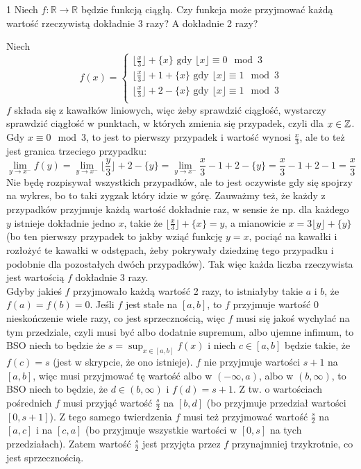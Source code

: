 \documentclass{../note}
\begin{document}
\begin{zadanie}{1}
Niech $f:\mathbb{R}\rightarrow\mathbb{R}$ będzie funkcją ciągłą. Czy funkcja może przyjmować każdą wartość rzeczywistą dokładnie 3 razy? A dokładnie 2 razy?
\end{zadanie}
\begin{rozwiazanie}
Niech
\[f(x) = \begin{cases}
    \lfloor\frac{x}{3}\rfloor + \{x\} \text{ gdy } \lfloor x\rfloor \equiv 0 \mod 3\\
    \lfloor\frac{x}{3}\rfloor + 1 + \{x\} \text{ gdy } \lfloor x\rfloor \equiv 1 \mod 3\\
    \lfloor\frac{x}{3}\rfloor + 2 - \{x\} \text{ gdy } \lfloor x\rfloor \equiv 1 \mod 3\\
\end{cases}\]
$f$ składa się z kawałków liniowych, więc żeby sprawdzić ciągłość, wystarczy sprawdzić ciągłość w punktach, w których zmienia się przypadek, czyli dla $x \in \mathbb{Z}$. Gdy $x \equiv 0 \mod 3$, to jest to pierwszy przypadek i wartość wynosi $\frac{x}{3}$, ale to też jest granica trzeciego przypadku:
\[\lim_{y\to x^-} f(y) = \lim_{y\to x^-} \lfloor\frac{y}{3}\rfloor + 2 - \{y\} = \lim_{y\to x^-} \frac{x}{3} - 1 + 2 - \{y\} = \frac{x}{3} - 1 + 2 - 1 = \frac{x}{3}\]
Nie będę rozpisywał wszystkich przypadków, ale to jest oczywiste gdy się spojrzy na wykres, bo to taki zygzak który idzie w górę. Zauważmy też, że każdy z przypadków przyjmuje każdą wartość dokładnie raz, w sensie że np. dla każdego $y$ istnieje dokładnie jedno $x$, takie że $\lfloor\frac{x}{3}\rfloor + \{x\} = y$, a mianowicie $x = 3\lfloor y \rfloor + \{y\}$ (bo ten pierwszy przypadek to jakby wziąć funkcję $y = x$, pociąć na kawałki i rozłożyć te kawałki w odstępach, żeby pokrywały dziedzinę tego przypadku i podobnie dla pozostałych dwóch przypadków). Tak więc każda liczba rzeczywista jest wartością $f$ dokładnie 3 razy.\\
Gdyby jakieś $f$ przyjmowało każdą wartość 2 razy, to istniałyby takie $a$ i $b$, że $f(a) = f(b) = 0$. Jeśli $f$ jest stałe na $[a, b]$, to $f$ przyjmuje wartość 0 nieskończenie wiele razy, co jest sprzecznością, więc $f$ musi się jakoś wychylać na tym przedziale, czyli musi być albo dodatnie supremum, albo ujemne infimum, to BSO niech to będzie że $s = \sup_{x\in[a, b]} f(x)$ i niech $c \in [a, b]$ będzie takie, że $f(c) = s$ (jest w skrypcie, że ono istnieje). $f$ nie przyjmuje wartości $s + 1$ na $[a, b]$, więc musi przyjmować tę wartość albo w $(-\infty, a)$, albo w $(b, \infty)$, to BSO niech to będzie, że $d \in (b, \infty)$ i $f(d) = s + 1$. Z tw. o wartościach pośrednich $f$ musi przyjąć wartość $\frac{s}{2}$ na $[b, d]$ (bo przyjmuje przedział wartości $[0, s + 1]$). Z tego samego twierdzenia $f$ musi też przyjmować wartość $\frac{s}{2}$ na $[a, c]$ i na $[c, a]$ (bo przyjmuje wszystkie wartości w $[0, s]$ na tych przedziałach). Zatem wartość $\frac{s}{2}$ jest przyjęta przez $f$ przynajmniej trzykrotnie, co jest sprzecznością.
\end{rozwiazanie}
\end{document}
